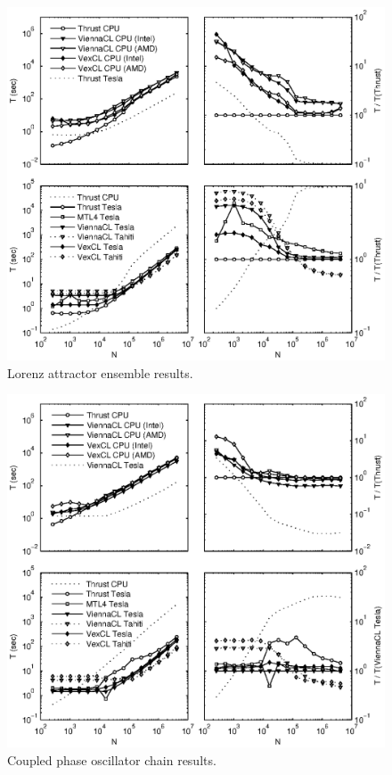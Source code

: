 \documentclass[final]{siamltex}
\begin{document}
\begin{figure}
    \begin{center}
      \includegraphics[width=\textwidth]{data/lorenz_ensemble/perfmtx}
    \end{center}
    \caption{Lorenz attractor ensemble results.}
    \label{fig:lorenz:perf}
\end{figure}

\begin{figure}
    \begin{center}
        \includegraphics[width=\textwidth]{data/phase_oscillator_chain/perfmtx}
    \end{center}
    \caption{Coupled phase oscillator chain results.}
    \label{fig:phase:perf}
\end{figure}
\end{document}
